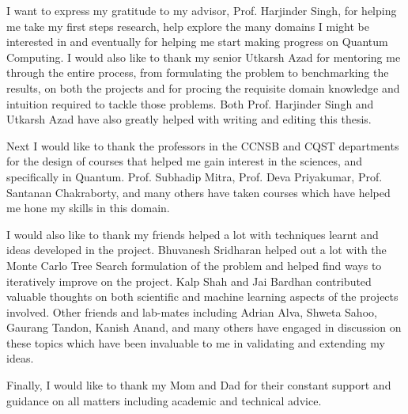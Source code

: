 I want to express my gratitude to my advisor, Prof. Harjinder Singh, for helping me take my first steps research, help explore the many domains I might be interested in and eventually for helping me start making progress on Quantum Computing. I would also like to thank my senior Utkarsh Azad for mentoring me through the entire process, from formulating the problem to benchmarking the results, on both the projects and for procing the requisite domain knowledge and intuition required to tackle those problems. Both Prof. Harjinder Singh and Utkarsh Azad have also greatly helped with writing and editing this thesis.

Next I would like to thank the professors in the CCNSB and CQST departments for the design of courses that helped me gain interest in the sciences, and specifically in Quantum. Prof. Subhadip Mitra, Prof. Deva Priyakumar, Prof. Santanan Chakraborty, and many others have taken courses which have helped me hone my skills in this domain.

I would also like to thank my friends helped a lot with techniques learnt and ideas developed in the project. Bhuvanesh Sridharan helped out a lot with the Monte Carlo Tree Search formulation of the problem and helped find ways to iteratively improve on the project. Kalp Shah and Jai Bardhan contributed valuable thoughts on both scientific and machine learning aspects of the projects involved. Other friends and lab-mates including Adrian Alva, Shweta Sahoo, Gaurang Tandon, Kanish Anand, and many others have engaged in discussion on these topics which have been invaluable to me in validating and extending my ideas.

Finally, I would like to thank my Mom and Dad for their constant support and guidance on all matters including academic and technical advice. 
